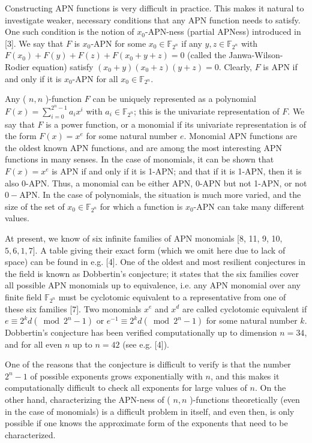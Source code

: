 \documentclass[10pt]{article}
\begin{document}
Constructing APN functions is very difficult in practice. This makes it natural to investigate weaker, necessary conditions that any APN function needs to satisfy. One such condition is the notion of $x_{0}$-APN-ness (partial APNess) introduced in [3]. We say that $F$ is $x_{0}$-APN for some $x_{0} \in \mathbb{F}_{2^{n}}$ if any $y, z \in \mathbb{F}_{2^{n}}$ with $F\left(x_{0}\right)+F(y)+F(z)+F\left(x_{0}+y+z\right)=0$ (called the Janwa-Wilson-Rodier equation) satisfy $\left(x_{0}+y\right)\left(x_{0}+z\right)(y+z)=0$. Clearly, $F$ is APN if and only if it is $x_{0}$-APN for all $x_{0} \in \mathbb{F}_{2^{n}}$.

Any ( $n, n$ )-function $F$ can be uniquely represented as a polynomial $F(x)= \sum_{i=0}^{2^{n}-1} a_{i} x^{i}$ with $a_{i} \in \mathbb{F}_{2^{n}}$; this is the univariate representation of $F$. We say that $F$ is a power function, or a monomial if its univariate representation is of the form $F(x)=x^{e}$ for some natural number $e$. Monomial APN functions are the oldest known APN functions, and are among the most interesting APN functions in many senses. In the case of monomials, it can be shown that $F(x)=x^{e}$ is APN if and only if it is 1-APN; and that if it is 1-APN, then it is also 0-APN. Thus, a monomial can be either APN, 0-APN but not 1-APN, or not $0-\mathrm{APN}$. In the case of polynomials, the situation is much more varied, and the size of the set of $x_{0} \in \mathbb{F}_{2^{n}}$ for which a function is $x_{0}$-APN can take many different values.

At present, we know of six infinite families of APN monomials [8, 11, 9, 10, $5,6,1,7]$. A table giving their exact form (which we omit here due to lack of space) can be found in e.g. [4]. One of the oldest and most resilient conjectures in the field is known as Dobbertin's conjecture; it states that the six families cover all possible APN monomials up to equivalence, i.e. any APN monomial over any finite field $\mathbb{F}_{2^{n}}$ must be cyclotomic equivalent to a representative from one of these six families [7]. Two monomials $x^{e}$ and $x^{d}$ are called cyclotomic equivalent if $e \equiv 2^{k} d\left(\bmod 2^{n}-1\right)$ or $e^{-1} \equiv 2^{k} d\left(\bmod 2^{n}-1\right)$ for some natural number $k$. Dobbertin's conjecture has been verified computationally up to dimension $n=34$, and for all even $n$ up to $n=42$ (see e.g. [4]).

One of the reasons that the conjecture is difficult to verify is that the number $2^{n}-1$ of possible exponents grows exponentially with $n$, and this makes it computationally difficult to check all exponents for large values of $n$. On the other hand, characterizing the APN-ness of ( $n, n$ )-functions theoretically (even in the case of monomials) is a difficult problem in itself, and even then, is only possible if one knows the approximate form of the exponents that need to be characterized.
\end{document}
